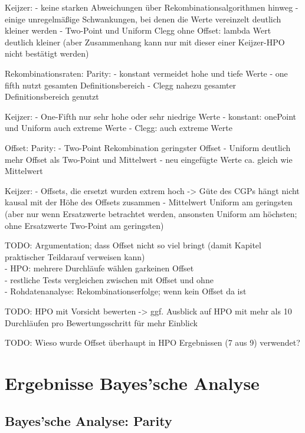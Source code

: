 Keijzer:
- keine starken Abweichungen über Rekombinationsalgorithmen hinweg
- einige unregelmäßige Schwankungen, bei denen die Werte vereinzelt deutlich kleiner werden
- Two-Point und Uniform Clegg ohne Offset: lambda Wert deutlich kleiner (aber Zusammenhang kann nur mit dieser einer Keijzer-HPO nicht bestätigt werden)

Rekombinationsraten:
Parity:
- konstant vermeidet hohe und tiefe Werte
- one fifth nutzt gesamten Definitionsbereich
- Clegg nahezu gesamter Definitionsbereich genutzt

Keijzer:
- One-Fifth nur sehr hohe oder sehr niedrige Werte
- konstant: onePoint und Uniform auch extreme Werte
- Clegg: auch extreme Werte

Offset:
Parity:
- Two-Point Rekombination geringster Offset
- Uniform deutlich mehr Offset als Two-Point und Mittelwert
- neu eingefügte Werte ca. gleich wie Mittelwert

Keijzer:
- Offsets, die ersetzt wurden extrem hoch
-> Güte des CGPs hängt nicht kausal mit der Höhe des Offsets zusammen
- Mittelwert Uniform am geringsten (aber nur wenn Ersatzwerte betrachtet werden, ansonsten Uniform am höchsten; ohne Ersatzwerte Two-Point am geringsten)



TODO: Argumentation; dass Offset nicht so viel bringt (damit Kapitel \glqq praktischer Teil\grqq\space darauf verweisen kann)\\
- HPO: mehrere Durchläufe wählen garkeinen Offset\\
- restliche Tests vergleichen zwischen mit Offset und ohne\\
- Rohdatenanalyse: Rekombinationserfolge; wenn kein Offset da ist

TODO: HPO mit Vorsicht bewerten -> ggf. Ausblick auf HPO mit mehr als 10 Durchläufen pro Bewertungsschritt für mehr Einblick

TODO: Wieso wurde Offset überhaupt in HPO Ergebnissen (7 aus 9) verwendet?





\section{Ergebnisse Bayes'sche Analyse}
\label{sec:ergebnisseBayes}

\subsection{Bayes'sche Analyse: Parity}
\label{subsec:bayesParity}

